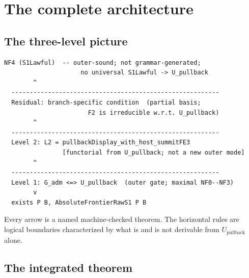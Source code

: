 \documentclass[11pt]{article}
\theoremstyle{plain}
\theoremstyle{definition}
\theoremstyle{remark}
\newcommand{\Upb}{U_{\mathrm{pullback}}}
\begin{document}
\section{The complete architecture}
\label{sec:architecture}

\subsection{The three-level picture}

\begin{center}
\begin{tcolorbox}[colback=gray!5, colframe=gray!40, width=0.88\linewidth,
  arc=3pt, boxrule=0.5pt]
\begin{Verbatim}[fontsize=\small]
  NF4 (S1Lawful)  -- outer-sound; not grammar-generated;
                     no universal S1Lawful -> U_pullback
        ^
  ---------------------------------------------------------
  Residual: branch-specific condition  (partial basis;
                       F2 is irreducible w.r.t. U_pullback)
        ^
  ---------------------------------------------------------
  Level 2: L2 = pullbackDisplay_with_host_summitFE3
                [functorial from U_pullback; not a new outer mode]
        ^
  ---------------------------------------------------------
  Level 1: G_adm <=> U_pullback  (outer gate; maximal NF0--NF3)
        v
  exists P B, AbsoluteFrontierRawS1 P B
\end{Verbatim}
\end{tcolorbox}
\end{center}

Every arrow is a named machine-checked theorem.  The horizontal rules
are logical boundaries characterized by what is and is not derivable
from $\Upb$ alone.

\subsection{The integrated theorem}
\end{document}

